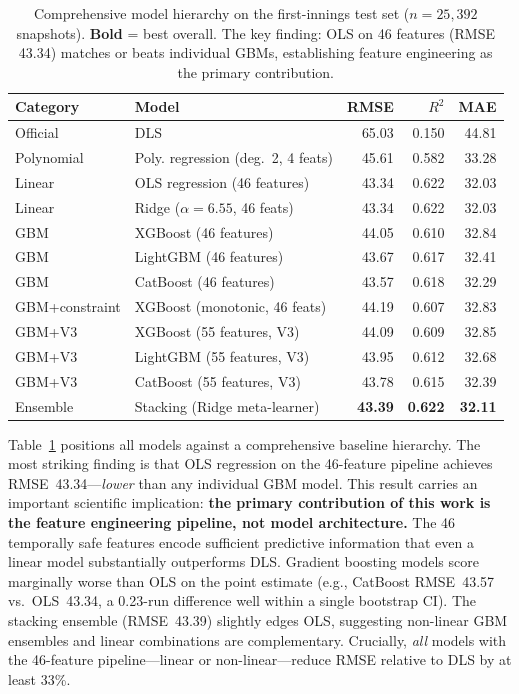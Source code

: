 \documentclass[10pt,a4paper,twocolumn]{article}
\begin{document}
\begin{table}[htbp]
\centering
\caption{Comprehensive model hierarchy on the first-innings test set ($n=25{,}392$ snapshots). \textbf{Bold} = best overall. The key finding: OLS on 46 features (RMSE 43.34) matches or beats individual GBMs, establishing feature engineering as the primary contribution.}
\label{tab:baseline_hierarchy}
\small
\begin{tabular}{llrrr}
\toprule
\textbf{Category} & \textbf{Model} & \textbf{RMSE} & $R^2$ & \textbf{MAE} \\
\midrule
Official        & DLS                              & 65.03 & 0.150 & 44.81 \\
Polynomial      & Poly. regression (deg.\ 2, 4 feats) & 45.61 & 0.582 & 33.28 \\
\midrule
Linear          & OLS regression (46 features)     & 43.34 & 0.622 & 32.03 \\
Linear          & Ridge ($\alpha=6.55$, 46 feats)  & 43.34 & 0.622 & 32.03 \\
\midrule
GBM             & XGBoost (46 features)            & 44.05 & 0.610 & 32.84 \\
GBM             & LightGBM (46 features)           & 43.67 & 0.617 & 32.41 \\
GBM             & CatBoost (46 features)           & 43.57 & 0.618 & 32.29 \\
GBM+constraint  & XGBoost (monotonic, 46 feats)    & 44.19 & 0.607 & 32.83 \\
GBM+V3          & XGBoost (55 features, V3)        & 44.09 & 0.609 & 32.85 \\
GBM+V3          & LightGBM (55 features, V3)       & 43.95 & 0.612 & 32.68 \\
GBM+V3          & CatBoost (55 features, V3)       & 43.78 & 0.615 & 32.39 \\
Ensemble        & Stacking (Ridge meta-learner)    & \textbf{43.39} & \textbf{0.622} & \textbf{32.11} \\
\bottomrule
\end{tabular}
\end{table}

Table~\ref{tab:baseline_hierarchy} positions all models against a comprehensive baseline hierarchy. The most striking finding is that OLS regression on the 46-feature pipeline achieves RMSE~43.34---\emph{lower} than any individual GBM model. This result carries an important scientific implication: \textbf{the primary contribution of this work is the feature engineering pipeline, not model architecture.} The 46 temporally safe features encode sufficient predictive information that even a linear model substantially outperforms DLS. Gradient boosting models score marginally worse than OLS on the point estimate (e.g., CatBoost RMSE~43.57 vs.\ OLS~43.34, a 0.23-run difference well within a single bootstrap CI). The stacking ensemble (RMSE~43.39) slightly edges OLS, suggesting non-linear GBM ensembles and linear combinations are complementary. Crucially, \emph{all} models with the 46-feature pipeline---linear or non-linear---reduce RMSE relative to DLS by at least 33\%.
\end{document}
